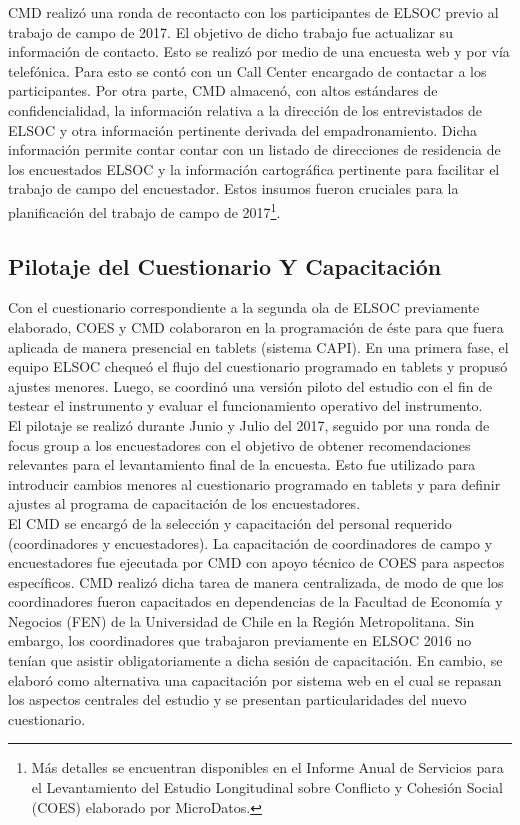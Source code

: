 \documentclass[12pt]{report}
\begin{document}
CMD realizó una ronda de recontacto con los participantes de ELSOC previo al trabajo de campo de 2017. El objetivo de dicho trabajo fue actualizar su información de contacto. Esto se realizó por medio de una encuesta web y por vía telefónica. Para esto se contó con un Call Center encargado de contactar a los participantes. Por otra parte, CMD almacenó, con altos estándares de confidencialidad, la información relativa a la dirección de los entrevistados de ELSOC y otra información pertinente derivada del empadronamiento. Dicha información permite contar contar con un listado de direcciones de residencia de los encuestados ELSOC y la información cartográfica pertinente para facilitar el trabajo de campo del encuestador. Estos insumos fueron cruciales para la planificación del trabajo de campo de 2017\footnote{Más detalles se encuentran disponibles en el Informe Anual de Servicios para el Levantamiento del Estudio Longitudinal sobre Conflicto y Cohesión Social (COES) elaborado por MicroDatos.}. \\

\subsection*{Pilotaje del Cuestionario Y Capacitación}

Con el cuestionario correspondiente a la segunda ola de ELSOC previamente elaborado, COES y CMD colaboraron en la programación de éste para que fuera aplicada de manera presencial en tablets (sistema CAPI). En una primera fase, el equipo ELSOC chequeó el flujo del cuestionario programado en tablets y propusó ajustes menores. Luego, se coordinó una versión piloto del estudio con el fin de testear el instrumento y evaluar el funcionamiento operativo del instrumento. \\

El pilotaje se realizó durante Junio y Julio del 2017, seguido por una ronda de focus group a los encuestadores con el objetivo de obtener recomendaciones relevantes para el levantamiento final de la encuesta. Esto fue utilizado para introducir cambios menores al cuestionario programado en tablets y para definir  ajustes al programa de capacitación de los encuestadores.\\

El CMD se encargó de la selección y capacitación del personal requerido (coordinadores y encuestadores). La capacitación de coordinadores de campo y encuestadores fue ejecutada por CMD con apoyo técnico de COES para aspectos específicos.  CMD realizó dicha tarea de manera centralizada, de modo de que los coordinadores fueron capacitados en dependencias de la Facultad de Economía y Negocios (FEN) de la Universidad de Chile en la Región Metropolitana. Sin embargo, los coordinadores que trabajaron previamente en ELSOC 2016 no tenían que asistir obligatoriamente a dicha sesión de capacitación. En cambio, se elaboró como alternativa una capacitación por sistema web en el cual se repasan los aspectos centrales del estudio y se presentan particularidades del nuevo cuestionario.\\
\end{document}
